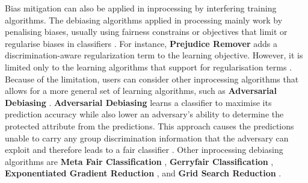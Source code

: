 \documentclass[sigconf,review]{acmart}
\begin{document}
Bias mitigation can also be applied in inprocessing by interfering training algorithms. The debiasing algorithms applied in processing mainly work by penalising biases, usually using fairness constrains or objectives that limit or regularise biases in classifiers \cite{mahoney2020ai}. For instance, \textbf{Prejudice Remover} \cite{kamishima2012prejudice} adds a discrimination-aware regularization term to the learning objective. However, it is limited only to the learning algorithms that support for regularisation terms \cite{mahoney2020ai,ibmaif3602022guidance}. Because of the limitation, users can consider other inprocessing algorithms that allows for a more general set of learning algorithms, such as \textbf{Adversarial Debiasing} \cite{mahoney2020ai,ibmaif3602022guidance}. \textbf{Adversarial Debiasing} \cite{zhang2018adversarial} learns a classifier to maximise its prediction accuracy while also lower an adversary's ability to determine the protected attribute from the predictions. This approach causes the predictions unable to carry any group discrimination information that the adversary can exploit and therefore leads to a fair classifier \cite{ibmaif3602022guidance}. Other inprocessing debiasing algorithms are \textbf{Meta Fair Classification} \cite{celis2019metafair}, \textbf{Gerryfair Classification} \cite{kearns2018gerry,kearns2019gerry}, \textbf{Exponentiated Gradient Reduction} \cite{agarwal18grid}, and \textbf{Grid Search Reduction} \cite{agarwal18grid,agarwal19grid}.
\end{document}
